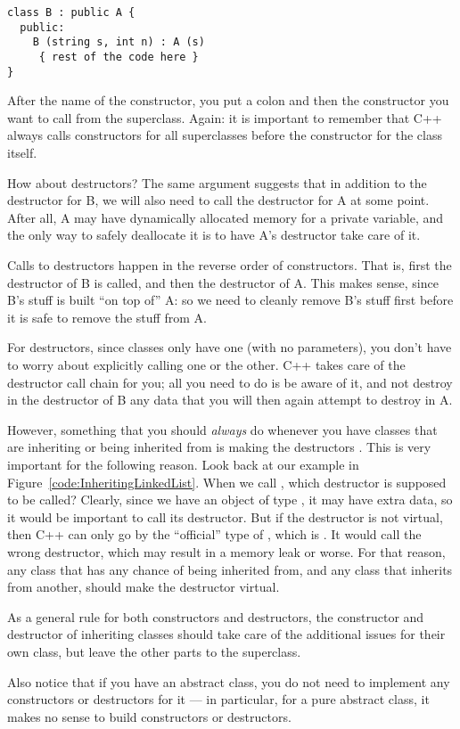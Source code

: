 \begin{verbatim}
class B : public A {
  public:
    B (string s, int n) : A (s)
     { rest of the code here }
}
\end{verbatim}


After the name of the constructor, you put a colon and then the
constructor you want to call from the superclass.
Again: it is important to remember that C++ always calls constructors
for all superclasses before the constructor for the class itself.

How about destructors? The same argument suggests that in addition to
the destructor for B, we will also need to call the destructor for A
at some point. After all, A may have dynamically allocated memory for
a private variable, and the only way to safely deallocate it is to
have A's destructor take care of it.

Calls to destructors happen in the reverse order of constructors. That
is, first the destructor of B is called, and then the destructor of
A. This makes sense, since B's stuff is built ``on top of'' A: so we
need to cleanly remove B's stuff first before it is safe to remove the
stuff from A.

For destructors, since classes only have one (with no parameters), you
don't have to worry about explicitly calling one or the other. C++
takes care of the destructor call chain for you; all you need to do is
be aware of it, and not destroy in the destructor of B any data that
you will then again attempt to destroy in A. 

However, something that you should \emph{always} do whenever you have
classes that are inheriting or being inherited from is making the
destructors . This is very important for the following
reason. Look back at our example in
Figure~\ref{code:InheritingLinkedList}. When we call
, which destructor is supposed to be called?
Clearly, since we have an object of type , it
may have extra data, so it would be important to call its
destructor. But if the destructor is not virtual, then C++ can only go
by the ``official'' type of , which is . It
would call the wrong destructor, which may result in a memory leak or
worse. For that reason, any class that has any chance of being
inherited from, and any class that inherits from another, should make
the destructor virtual.

As a general rule for both constructors and destructors, the
constructor and destructor of inheriting classes should take care of
the additional issues for their own class, but leave the other parts
to the superclass.

Also notice that if you have an abstract class, you do not need to
implement any constructors or destructors for it --- in particular,
for a pure abstract class, it makes no sense to build constructors or
destructors.
